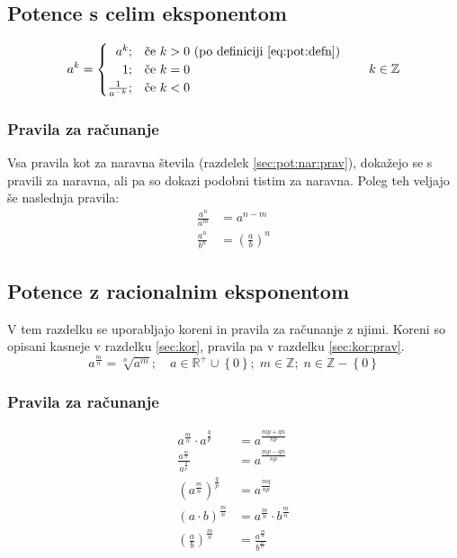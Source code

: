 \documentclass[a4paper,oneside,12pt,fleqn]{article}
\def\R{\ensuremath{\mathbb R}}
\def\Z{\ensuremath{\mathbb Z}}
\newcommand\krat\cdot
\numberwithin{equation}{section}
\begin{document}
\subsection{Potence s celim eksponentom}
\label{sec:pot:cela}
\begin{equation}
  \label{eq:pot:defz}
  a^k =
  \begin{cases}
    \hfill a^k; & \text{če $k > 0$ (po definiciji \eqref{eq:pot:defn})} \\
    \hfill 1;   & \text{če $k = 0$} \\
    \hfill \frac{1}{a^{-k}}; & \text{če $k < 0$}
  \end{cases}
  \qquad k \in \Z
\end{equation}


\subsubsection{Pravila za računanje}
\label{sec:pot:cela:prav}
Vsa pravila kot za naravna števila (razdelek \ref{sec:pot:nar:prav}), dokažejo se s pravili za naravna, ali pa so dokazi
podobni tistim za naravna. Poleg teh veljajo še naslednja pravila:
\begin{align}
  \frac{a^n}{a^m} &= a^{n-m} \label{eq:pot:anandelanam} \\
  \frac{a^n}{b^n} &= \left( \frac{a}{b} \right)^n
\end{align}

\subsection{Potence z racionalnim eksponentom}
\label{sec:pot:rac}
V tem razdelku se uporabljajo koreni in pravila za računanje z njimi. Koreni so opisani
kasneje v razdelku \ref{sec:kor}, pravila pa v razdelku \ref{sec:kor:prav}.
\begin{equation}
  \label{eq:pot:defrac}
  a^{\frac{m}{n}} = \sqrt[n]{a^m}; \quad a \in \R^+ \cup \left\{ 0 \right\}; \; m \in \Z;
  \; n \in \Z - \left\{ 0 \right\}
\end{equation}

\subsubsection{Pravila za računanje}
\label{sec:pot:rac:prav}
\begin{align}
  a^{\frac{m}{n}} \krat a^{\frac{q}{p}} &= a^{\frac{mp+qn}{np}} \label{eq:pot:rac:prav:prodpot} \\
  \frac{a^{\frac{m}{n}}}{a^{\frac{q}{p}}} &= a^{\frac{mp-qn}{np}} \label{eq:pot:rac:prav:kvocpot} \\
  \left( a^{\frac{m}{n}} \right)^{\frac{q}{p}} &= a^{\frac{mq}{np}} \label{eq:pot:rac:prav:potpot} \\
  \left( a \krat b \right)^{\frac{m}{n}} &= a^{\frac{m}{n}} \krat b^{\frac{m}{n}}
  \label{eq:pot:rac:prav:potprod} \\
  \left( \frac{a}{b} \right)^{\frac{m}{n}} &= \frac{a^{\frac{m}{n}}}{b^{\frac{m}{n}}}
  \label{eq:pot:rac:prav:potkvoc} \\
\end{align}
\end{document}
